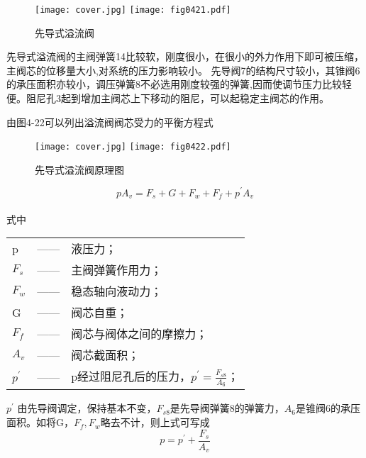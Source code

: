 \begin{figure}
   \centering
    \ifOpenSource  
    \texttt{[image: cover.jpg]}
    \else
   \texttt{[image: fig0421.pdf]}
   \fi
   \caption{先导式溢流阀}
   \label{fig:fig0421}
   \end{figure}
先导式溢流阀的主阀弹簧14比较软，刚度很小，在很小的外力作用下即可被压缩，主阀芯的位移量大小,对系统的压力影响较小。
先导阀7的结构尺寸较小，其锥阀6的承压面积亦较小，调压弹簧8不必选用刚度较强的弹簧,因而使调节压力比较轻便。阻尼孔3起到增加主阀芯上下移动的阻尼，可以起稳定主阀芯的作用。%
\par 由图4-22可以列出溢流阀阀芯受力的平衡方程式
\begin{figure}
   \centering
    \ifOpenSource  
    \texttt{[image: cover.jpg]}
    \else
   \texttt{[image: fig0422.pdf]}
   \fi
   \caption{先导式溢流阀原理图}
   \label{fig:fig0422}
   \end{figure}
\begin{equation}
   pA_{v}=F_{s}+G+F_{w}+F_{f}+p^{'}A_{v} %
\end{equation}
\\式中\
\begin{tabular}[t]{lp{8mm}l}
   p &—— &液压力；\\
   $F_{s}$ &—— &主阀弹簧作用力；\\
   $F_{w}$ &——&稳态轴向液动力；\\
  G &——&阀芯自重；\\
  $F_{f}$&——&阀芯与阀体之间的摩擦力；\\
 $A_{v}$&——&阀芯截面积；\\
  $p^{'}$&——&p经过阻尼孔后的压力，$p^{'}=\frac{F_{s8}}{A_6}$；\\
\end{tabular}
\par $p^{'}$ 由先导阀调定，保持基本不变，$F_{s8}$是先导阀弹簧8的弹簧力，$A_{6}$是锥阀6的承压面积。如将G，$F_f,F_w$略去不计，则上式可写成
\begin{equation}
   p=p^{'}+\frac{F_{s}}{A_v}
\end{equation}
  
